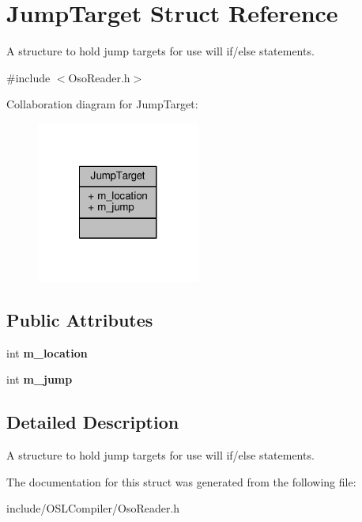 \hypertarget{struct_jump_target}{\section{Jump\-Target Struct Reference}
\label{struct_jump_target}
}


A structure to hold jump targets for use will if/else statements.  




{\ttfamily \#include $<$Oso\-Reader.\-h$>$}



Collaboration diagram for Jump\-Target\-:
\nopagebreak
\begin{figure}[H]
\begin{center}
\leavevmode
\includegraphics[width=152pt]{struct_jump_target__coll__graph}
\end{center}
\end{figure}
\subsection*{Public Attributes}
\begin{DoxyCompactItemize}
\item 
\hypertarget{struct_jump_target_a96654265b4443a164bd74cdddf7fbb70}{int {\bfseries m\-\_\-location}}\label{struct_jump_target_a96654265b4443a164bd74cdddf7fbb70}

\item 
\hypertarget{struct_jump_target_aac06f4a996acfb8e891735b94538efe4}{int {\bfseries m\-\_\-jump}}\label{struct_jump_target_aac06f4a996acfb8e891735b94538efe4}

\end{DoxyCompactItemize}


\subsection{Detailed Description}
A structure to hold jump targets for use will if/else statements. 

The documentation for this struct was generated from the following file\-:\begin{DoxyCompactItemize}
\item 
include/\-O\-S\-L\-Compiler/Oso\-Reader.\-h\end{DoxyCompactItemize}
